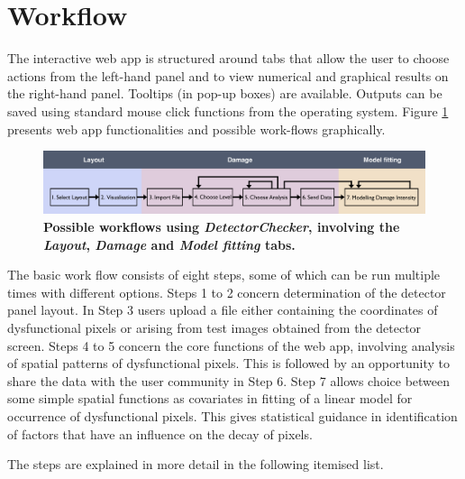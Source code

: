 \documentclass[11pt,a4paper]{article}
\newcommand{\DetectorChecker}{\emph{DetectorChecker}\xspace}
\begin{document}
\section{Workflow}\label{flow}

The interactive web app is structured around tabs that allow the user to choose actions from the left-hand panel and to view 
numerical and graphical results on the right-hand panel. Tooltips (in pop-up boxes) are available.
Outputs can be saved using standard mouse click functions from the operating system. 
Figure \ref{fig_flowchart} presents web app functionalities and possible work-flows
graphically.

\begin{figure}[htbp]
	\begin{center}
		\includegraphics[width=14.5cm]{flowchartDCshort.pdf}
		\vspace{-7mm}
		\caption
		{
			{\bfseries 
				Possible workflows using \DetectorChecker, involving
				the \emph{Layout}, \emph{Damage} and
				\emph{Model fitting} tabs.}
		}
		\label{fig_flowchart}
	\end{center}
\end{figure}
The basic work flow consists of eight steps,
some of which can be run multiple times with different options.
Steps 1 to 2 
concern determination of the detector panel layout.
In Step 3 users upload a file either containing the coordinates of dysfunctional pixels or arising from test images obtained from the detector screen. 
Steps 4 to 5 
concern the core functions of the web app, involving analysis of spatial patterns of dysfunctional pixels. This is followed by an opportunity to share the data with the user community in Step 6. Step 7 allows choice
between some simple spatial functions as covariates in fitting of a linear model for 
occurrence of dysfunctional pixels. 
This gives statistical guidance
in identification of factors that have an influence on the decay of pixels. 

The steps are explained in more detail in the
following itemised list.

\bigskip
\end{document}
